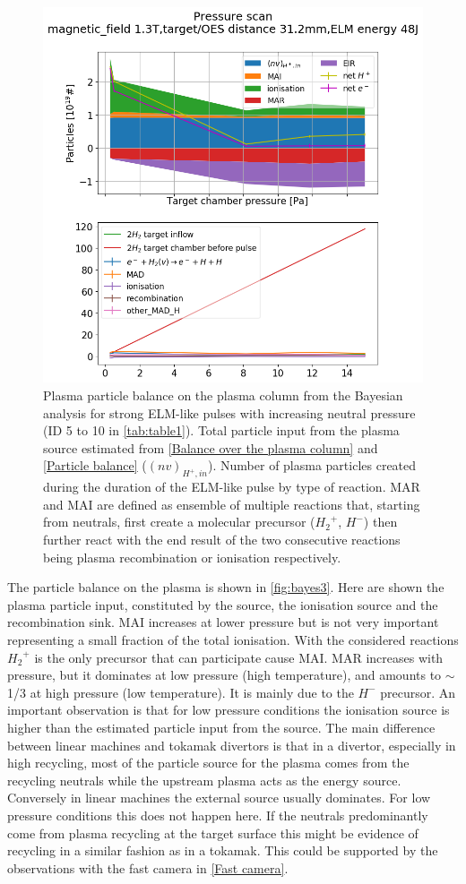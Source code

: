 \begin{figure}[!ht]
        \centering
    	\includegraphics[width=0.7\linewidth,trim={30 260 60 60},clip]{Chapters/chapter3/figs/bayesian_strong_6.png}
	\caption{Plasma particle balance on the plasma column from the Bayesian analysis for strong ELM-like pulses with increasing neutral pressure (ID 5 to 10 in \autoref{tab:table1}). Total particle input from the plasma source estimated from \autoref{Balance over the plasma column} and \ref{Particle balance} ($(nv)_{H^+,in}$). Number of plasma particles created during the duration of the ELM-like pulse by type of reaction. MAR and MAI are defined as ensemble of multiple reactions that, starting from neutrals, first create a molecular precursor (${H_2}^+$, $H^-$) then further react with the end result of the two consecutive reactions being plasma recombination or ionisation respectively.\cite{Verhaegh2020}}
	\label{fig:bayes3}
\end{figure}
The particle balance on the plasma is shown in \autoref{fig:bayes3}.
Here are shown the plasma particle input, constituted by the source, the ionisation source and the recombination sink. MAI increases at lower pressure but is not very important representing a small fraction of the total ionisation. With the considered reactions ${H_2}^+$ is the only precursor that can participate cause MAI. MAR increases with pressure, but it dominates at low pressure (high temperature), and amounts to $\sim$1/3 at high pressure (low temperature). It is mainly due to the $H^-$ precursor. An important observation is that for low pressure conditions the ionisation source is higher than the estimated particle input from the source. The main difference between linear machines and tokamak divertors is that in a divertor, especially in high recycling, most of the particle source for the plasma comes from the recycling neutrals while the upstream plasma acts as the energy source. Conversely in linear machines the external source usually dominates. For low pressure conditions this does not happen here. If the neutrals predominantly come from plasma recycling at the target surface this might be evidence of recycling in a similar fashion as in a tokamak. This could be supported by the observations with the fast camera in \autoref{Fast camera}.
